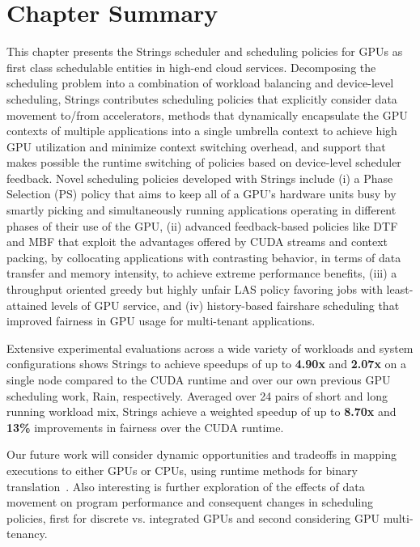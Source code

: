 \section{Chapter Summary}
This chapter presents the Strings scheduler and scheduling policies for GPUs as first class schedulable entities in high-end cloud services. Decomposing the scheduling problem into a combination of workload balancing and device-level scheduling, Strings contributes scheduling policies that explicitly consider data movement to/from accelerators, methods that dynamically encapsulate the GPU contexts of multiple applications into a single umbrella context to achieve high GPU utilization and minimize context switching overhead, and support that makes possible the runtime switching of policies based on device-level scheduler feedback. Novel scheduling policies developed with Strings include (i) a Phase Selection (PS) policy that aims to keep all of a GPU’s hardware units busy by smartly picking and simultaneously running applications operating in different phases of their use of the GPU, (ii) advanced feedback-based policies like DTF and MBF that exploit the advantages offered by CUDA streams and context packing, by collocating applications with contrasting behavior, in terms of data transfer and memory intensity, to achieve extreme performance benefits, (iii) a throughput oriented greedy but highly unfair LAS policy favoring jobs with least-attained levels of GPU service, and (iv) history-based fairshare scheduling that improved fairness in GPU usage for multi-tenant applications.

Extensive experimental evaluations across a wide variety of workloads and system configurations shows Strings to achieve speedups of up to \textbf{4.90x} and \textbf{2.07x} on a single node compared to the CUDA runtime and over our own previous GPU scheduling work, Rain, respectively. Averaged over 24 pairs of short and long running workload mix, Strings achieve a weighted speedup of up to \textbf{8.70x }and \textbf{13\%} improvements in fairness over the CUDA runtime.

Our future work will consider dynamic opportunities and tradeoffs in mapping executions to either GPUs or CPUs, using runtime methods for binary translation~\cite{ocelot}. Also interesting is further exploration of the effects of data movement on program performance and consequent changes in scheduling policies, first for discrete vs. integrated GPUs and second considering GPU multi-tenancy.
